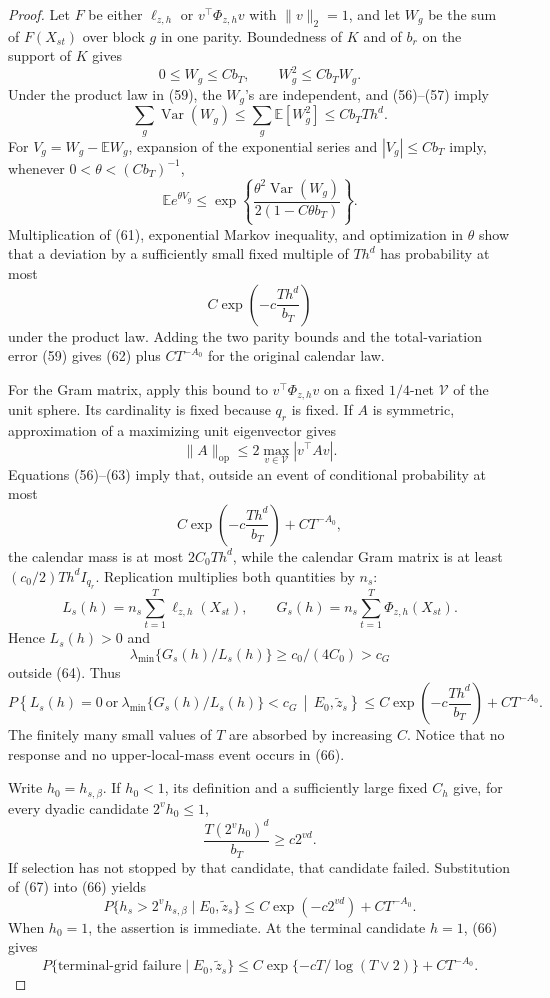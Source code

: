 \documentclass{article}
\begin{document}
\begin{proof}
Let \(F\) be either \(\ell_{z,h}\) or
\(v^\top\Phi_{z,h}v\) with \(\|v\|_2=1\), and let \(W_g\) be the sum of \(F(X_{st})\) over block \(g\) in one parity.  Boundedness of \(K\) and of \(b_r\) on the support of \(K\) gives
\[
0\leq W_g\leq Cb_T,
\qquad
W_g^2\leq Cb_TW_g.
\]
Under the product law in (59), the \(W_g\)'s are independent, and (56)--(57) imply
\[
\sum_g\operatorname{Var}(W_g)
\leq\sum_g\mathbb E[W_g^2]
\leq Cb_TTh^d.
\tag{60}
\]
For \(V_g=W_g-\mathbb EW_g\), expansion of the exponential series and \(|V_g|\leq Cb_T\) imply, whenever \(0<\theta<(Cb_T)^{-1}\),
\[
\mathbb Ee^{\theta V_g}
\leq\exp\!\left\{
\frac{\theta^2\operatorname{Var}(W_g)}{2(1-C\theta b_T)}
\right\}.
\tag{61}
\]
Multiplication of (61), exponential Markov inequality, and optimization in \(\theta\) show that a deviation by a sufficiently small fixed multiple of \(Th^d\) has probability at most
\[
C\exp\!\left(-c\frac{Th^d}{b_T}\right)
\tag{62}
\]
under the product law.  Adding the two parity bounds and the total-variation error (59) gives (62) plus \(CT^{-A_0}\) for the original calendar law.

For the Gram matrix, apply this bound to \(v^\top\Phi_{z,h}v\) on a fixed \(1/4\)-net \(\mathcal V\) of the unit sphere.  Its cardinality is fixed because \(q_r\) is fixed.  If \(A\) is symmetric, approximation of a maximizing unit eigenvector gives
\[
\|A\|_{\mathrm{op}}
\leq2\max_{v\in\mathcal V}|v^\top Av|.
\tag{63}
\]
Equations (56)--(63) imply that, outside an event of conditional probability at most
\[
C\exp\!\left(-c\frac{Th^d}{b_T}\right)+CT^{-A_0},
\tag{64}
\]
the calendar mass is at most \(2C_0Th^d\), while the calendar Gram matrix is at least \((c_0/2)Th^dI_{q_r}\).  Replication multiplies both quantities by \(n_s\):
\[
L_s(h)=n_s\sum_{t=1}^{T}\ell_{z,h}(X_{st}),
\qquad
G_s(h)=n_s\sum_{t=1}^{T}\Phi_{z,h}(X_{st}).
\tag{65}
\]
Hence \(L_s(h)>0\) and
\[
\lambda_{\min}\{G_s(h)/L_s(h)\}
\geq c_0/(4C_0)>c_G
\]
outside (64).  Thus
\[
P\!\left\{L_s(h)=0\ \text{or}\ 
\lambda_{\min}\{G_s(h)/L_s(h)\}<c_G
\,\middle|\,E_0,\widetilde z_s\right\}
\leq C\exp\!\left(-c\frac{Th^d}{b_T}\right)+CT^{-A_0}.
\tag{66}
\]
The finitely many small values of \(T\) are absorbed by increasing \(C\).  Notice that no response and no upper-local-mass event occurs in (66).

Write \(h_0=h_{s,\beta}\).  If \(h_0<1\), its definition and a sufficiently large fixed \(C_h\) give, for every dyadic candidate \(2^vh_0\leq1\),
\[
\frac{T(2^vh_0)^d}{b_T}\geq c2^{vd}.
\tag{67}
\]
If selection has not stopped by that candidate, that candidate failed.  Substitution of (67) into (66) yields
\[
P\{h_s>2^vh_{s,\beta}\mid E_0,\widetilde z_s\}
\leq C\exp(-c2^{vd})+CT^{-A_0}.
\tag{68}
\]
When \(h_0=1\), the assertion is immediate.  At the terminal candidate \(h=1\), (66) gives
\[
P\{\text{terminal-grid failure}\mid E_0,\widetilde z_s\}
\leq C\exp\{-cT/\log(T\vee2)\}+CT^{-A_0}.
\tag{69}
\]


\end{proof}
\end{document}
